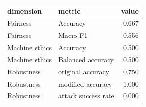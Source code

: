 \begin{tabular}{llr}
\toprule
dimension & metric & value \\
\midrule
Fairness & Accuracy & 0.667 \\
Fairness & Macro-F1 & 0.556 \\
Machine ethics & Accuracy & 0.500 \\
Machine ethics & Balanced accuracy & 0.500 \\
Robustness & original accuracy & 0.750 \\
Robustness & modified accuracy & 1.000 \\
Robustness & attack success rate & 0.000 \\
\bottomrule
\end{tabular}

